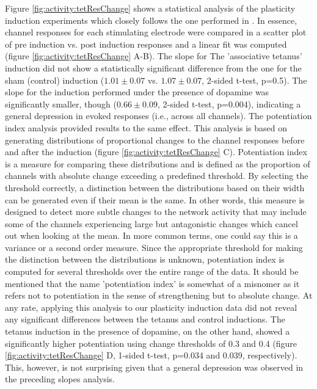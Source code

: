     Figure \ref{fig:activity:tetResChange} shows a statistical analysis of the plasticity induction experiments which closely follows the one performed in \cite{chiappalone2008network}. In essence, channel responses for each stimulating electrode were compared in a scatter plot of pre induction vs. post induction responses and a linear fit was computed (figure \ref{fig:activity:tetResChange} A-B). The slope for The 'associative tetanus' induction did not show a statistically significant difference from the one for the sham (control) induction (\(1.01\pm0.07\) vs. \(1.07\pm0.07\), 2-sided t-test, p=0.5). The slope for the induction performed under the presence of dopamine was significantly smaller, though (\(0.66\pm0.09\), 2-sided t-test, p=0.004), indicating a general depression in evoked responses (i.e., across all channels). The potentiation index analysis provided results to the same effect. This analysis is based on generating distributions of proportional changes to the channel responses before and after the induction (figure \ref{fig:activity:tetResChange} C). Potentiation index is a measure for comparing these distributions and is defined as the proportion of channels with absolute change exceeding a predefined threshold. By selecting the threshold correctly, a distinction between the distributions based on their width can be generated even if their mean is the same. In other words, this measure is designed to detect more subtle changes to the network activity that may include some of the channels experiencing large but antagonistic changes which cancel out when looking at the mean. In more common terms, one could say this is a variance or a second order measure. Since the appropriate threshold for making the distinction between the distributions is unknown, potentiation index is computed for several thresholds over the entire range of the data. It should be mentioned that the name 'potentiation index' is somewhat of a misnomer as it refers not to potentiation in the sense of strengthening but to absolute change. At any rate, applying this analysis to our plasticity induction data did not reveal any significant differences between the tetanus and control inductions. The tetanus induction in the presence of dopamine, on the other hand, showed a significantly higher potentiation using change thresholds of 0.3 and 0.4 (figure \ref{fig:activity:tetResChange} D, 1-sided t-test, p=0.034 and 0.039, respectively). This, however, is not surprising given that a general depression was observed in the preceding slopes analysis.






